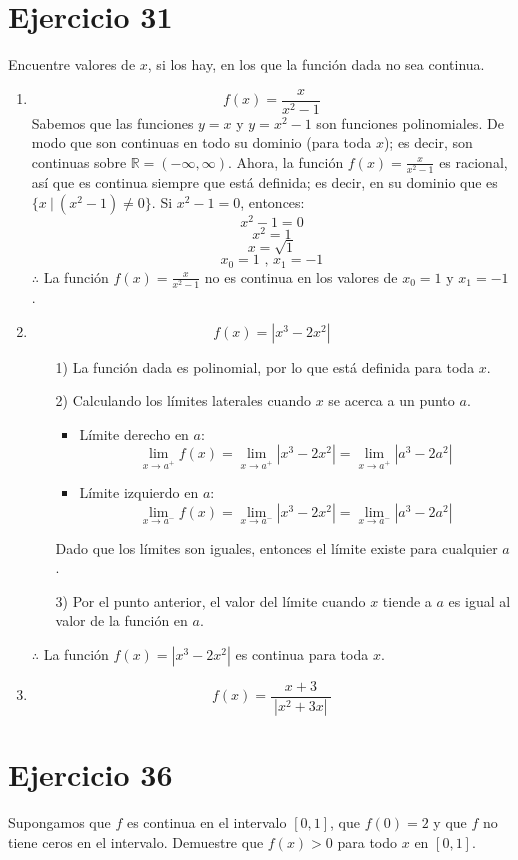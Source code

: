 \documentclass[12pt]{article}
\begin{document}
\section{Ejercicio 31}
Encuentre valores de $x$, si los hay, en los que la función dada no sea continua.
\begin{enumerate}[label=(\alph*)]
\item \[ f(x)=\frac{x}{x^2-1} \]
Sabemos que las funciones $y=x$ y $y=x^2-1$ son funciones polinomiales. De modo que son continuas en todo su dominio (para toda $x$); es decir, son continuas sobre $\mathbb R=(-\infty,\infty)$. Ahora, la función $f(x)=\frac{x}{x^2-1}$ es racional, así que es continua siempre que está definida; es decir, en su dominio que es $\{ x ~|~ (x^2-1) \neq 0 \}$. Si $x^2-1=0$, entonces:
\[
x^2-1=0
\]
\[
x^2=1
\]
\[
x=\sqrt{1}
\]
\[
x_0=1 \text{ , } x_1=-1
\]
$\therefore$ La función $f(x)=\frac{x}{x^2-1}$ no es continua en los valores de $x_0=1 \text{ y } x_1=-1$.

\item \[ f(x)= | x^3-2x^2 | \]
\begin{enumerate}
	\item[1)] La función dada es polinomial, por lo que está definida para toda $x$.
	\item[2)] Calculando los límites laterales cuando $x$ se acerca a un punto $a$.
	\begin{itemize}
		\item Límite derecho en $a$:
		\[ 
		\lim_{x \to a^+}f(x) = \lim_{x \to a^+}| x^3-2x^2 | =\lim_{x \to a^+}| a^3-2a^2 |
		\]
		\item Límite izquierdo en $a$:
		\[ 
		\lim_{x \to a^-}f(x) = \lim_{x \to a^-}| x^3-2x^2 | =\lim_{x \to a^-}| a^3-2a^2 |
		\]
	\end{itemize}
	Dado que los límites son iguales, entonces el límite existe para cualquier $a$.
	\item[3)] Por el punto anterior, el valor del límite cuando $x$ tiende a $a$ es igual al valor de la función en $a$.
\end{enumerate}
$\therefore$ La función $f(x)= |x^3-2x^2 |$ es continua para toda $x$.

\item \[ f(x)=\frac{x+3}{~|x^2+3x|~} \]
\end{enumerate}

\section{Ejercicio 36}
Supongamos que $f$ es continua en el intervalo $[0, 1]$, que $f(0) = 2$ y que $f$ no tiene ceros en el intervalo. Demuestre que $f(x) > 0$ para todo $x$ en $[0, 1]$.\\ \\
\end{document}
